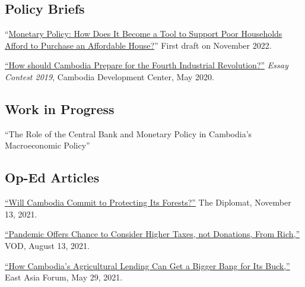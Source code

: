 \documentclass[10pt,a4paper]{article}
\begin{document}
\subsection*{Policy Briefs}
	“\href{}{Monetary Policy: How Does It Become a Tool to Support Poor Households Afford to Purchase an Affordable House?}” First draft on November 2022. \\ \vspace{-.5em}
	
		\href{https://cd-center.org/en/essay-contest-2019-first-place-winner/}{``How should Cambodia Prepare for the Fourth Industrial Revolution?''} \textit{Essay Contest 2019}, Cambodia Development Center, May 2020.

\subsection*{Work in Progress}
	
	``The Role of the Central Bank and Monetary Policy in Cambodia's Macroeconomic Policy''

\subsection*{Op-Ed Articles}

	\href{https://thediplomat.com/2021/11/will-cambodia-commit-to-protecting-its-forests/}{``Will Cambodia Commit to Protecting Its Forests?''} The Diplomat, November 13, 2021.\\ \vspace{-.5em}

	\href{https://vodenglish.news/opinion-pandemic-offers-chance-to-consider-higher-taxes-not-donations-from-rich/}{``Pandemic Offers Chance to Consider Higher Taxes, not Donations, From Rich,''} VOD, August 13, 2021.\\ \vspace{-.5em}

	\href{https://www.eastasiaforum.org/2021/05/29/how-cambodias-agricultural-lending-can-get-a-bigger-bang-for-its-buck/}{``How Cambodia's Agricultural Lending Can Get a Bigger Bang for Its Buck,''} East Asia Forum, May 29, 2021.\\ \vspace{-.5em}
\end{document}
